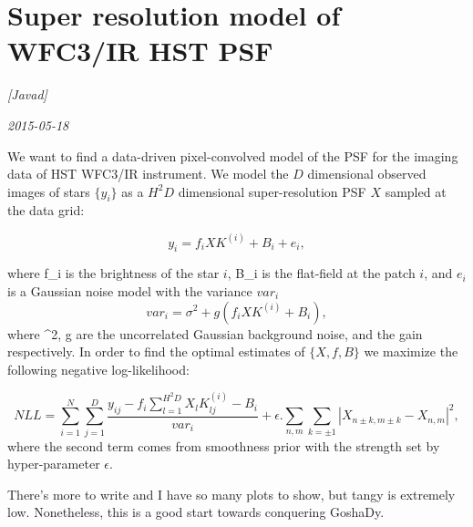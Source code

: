 \documentclass[12pt, pdftex]{article}
\begin{document}
\section*{Super resolution model of WFC3/IR HST PSF}
\noindent
\textsl{[Javad]}

\noindent
\textsl{2015-05-18}

We want to find a data-driven pixel-convolved model of the PSF for the imaging data of HST WFC3/IR
instrument. We model the $D$ dimensional observed images of stars $\{y_i\}$ as a $H^2D$ dimensional 
super-resolution PSF $X$ sampled at the data grid:

\begin{equation}
y_i= f_iXK^{(i)} + B_i + e_i,
\end{equation}

where f_i is the brightness of the star $i$, B_i is the flat-field at the patch $i$, and $e_i$ is 
a Gaussian noise model with the variance $var_i$
\begin{equation}
var_i = \sigma^{2} + g(f_iXK^{(i)} + B_i),
\end{equation}
where \sigma^{2}, g are the uncorrelated Gaussian background noise, and the gain respectively.
In order to find the optimal estimates of $\{X,f,B\}$ we maximize the following negative log-likelihood:

\begin{equation}
NLL = \sum_{i=1}^{N}\sum_{j=1}^{D} \frac{y_{ij}-f_{i}\sum_{l=1}^{H^{2}D}X_{l}K^{(i)}_{lj}-B_{i}}{var_{i}} + \epsilon.\sum_{n,m}\sum_{k=\pm1} |X_{n\pm k,m\pm k}-X_{n,m}|^{2},
\end{equation}
where the second term comes from smoothness prior with the strength set by hyper-parameter $\epsilon$.

There's more to write and I have so many plots to show, but tangy is extremely low.
Nonetheless, this is a good start towards conquering GoshaDy.
 
\end{document}
